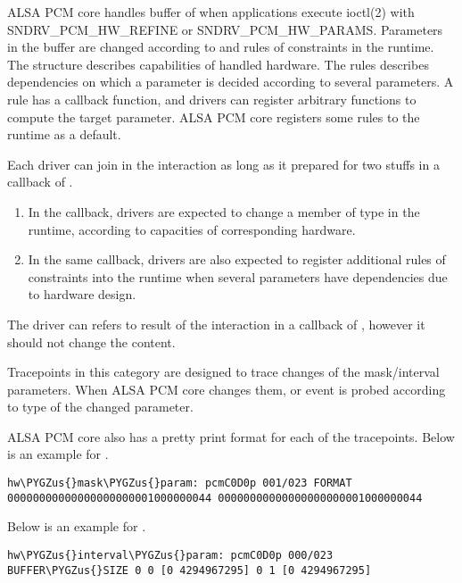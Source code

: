 \documentclass[a4paper,8pt,english]{sphinxmanual}
\def\PYGZus{\char`\_}
\begin{document}
ALSA PCM core handles buffer of  when
applications execute ioctl(2) with SNDRV\_PCM\_HW\_REFINE or SNDRV\_PCM\_HW\_PARAMS.
Parameters in the buffer are changed according to
 and rules of constraints in the runtime. The
structure describes capabilities of handled hardware. The rules describes
dependencies on which a parameter is decided according to several parameters.
A rule has a callback function, and drivers can register arbitrary functions
to compute the target parameter. ALSA PCM core registers some rules to the
runtime as a default.

Each driver can join in the interaction as long as it prepared for two stuffs
in a callback of .
\begin{enumerate}
\item {} 
In the callback, drivers are expected to change a member of
 type in the runtime, according to
capacities of corresponding hardware.

\item {} 
In the same callback, drivers are also expected to register additional rules
of constraints into the runtime when several parameters have dependencies
due to hardware design.

\end{enumerate}

The driver can refers to result of the interaction in a callback of
, however it should not change the
content.

Tracepoints in this category are designed to trace changes of the
mask/interval parameters. When ALSA PCM core changes them,  or
 event is probed according to type of the changed parameter.

ALSA PCM core also has a pretty print format for each of the tracepoints. Below
is an example for .

\begin{Verbatim}[commandchars=\\\{\}]
hw\PYGZus{}mask\PYGZus{}param: pcmC0D0p 001/023 FORMAT 00000000000000000000001000000044 00000000000000000000001000000044
\end{Verbatim}

Below is an example for .

\begin{Verbatim}[commandchars=\\\{\}]
hw\PYGZus{}interval\PYGZus{}param: pcmC0D0p 000/023 BUFFER\PYGZus{}SIZE 0 0 [0 4294967295] 0 1 [0 4294967295]
\end{Verbatim}
\end{document}
